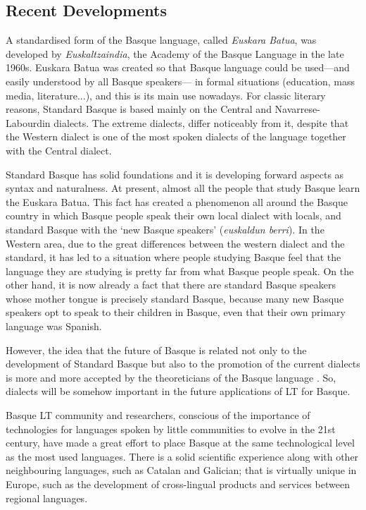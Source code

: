 \begin{multicols}{2}
\subsection{Recent Developments}

  A standardised form of the Basque language, called \textit{Euskara Batua}, was developed by \textit{Euskaltzaindia}, the Academy of the Basque Language in the late 1960s. Euskara Batua was created so that Basque language could be used—and easily understood by all Basque speakers— in formal situations (education, mass media, literature...), and this is its main use nowadays. For classic literary reasons, Standard Basque is based mainly on the Central and Navarrese-Labourdin dialects. The extreme dialects, differ noticeably from it, despite that the Western dialect is one of the most spoken dialects of the language together with the Central dialect.

Standard Basque has solid foundations and it is developing forward aspects as syntax and naturalness. At present, almost all the people that study Basque learn the Euskara Batua. This fact has created a phenomenon all around the Basque country in which Basque people speak their own local dialect with locals, and standard Basque with the ‘new Basque speakers’ (\textit{euskaldun berri}). In the Western area, due to the great differences between the western dialect and the standard, it has led to a situation where people studying Basque feel that the language they are studying is pretty far from what Basque people speak. On the other hand, it is now already a fact that there are standard Basque speakers whose mother tongue is precisely standard Basque, because many new Basque speakers opt to speak to their children in Basque, even that their own primary language was Spanish. 

However, the idea that the future of Basque is related not only to the development of Standard Basque but also to the promotion of the current dialects is more and more accepted by the theoreticians of the Basque language \cite{BAS-Nota9}. So, dialects will be somehow important in the future applications of LT for Basque.

Basque LT community and researchers, conscious of the importance of technologies for languages spoken by little communities to evolve in the 21st century, have made a great effort to place Basque at the same technological level as the most used languages. There is a solid scientific experience along with other neighbouring languages, such as Catalan and Galician; that is virtually unique in Europe, such as the development of cross-lingual products and services between regional languages.


\end{multicols}
